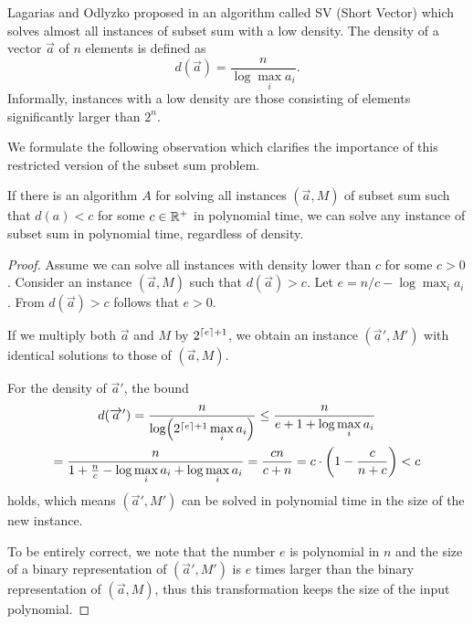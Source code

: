 Lagarias and Odlyzko proposed in \cite{lagarias-odlyzko} an algorithm
called SV (Short Vector) which solves almost all instances of subset sum
with a low density. The density of a vector $\vec{a}$ of $n$ elements is
defined as
$$
    d(\vec{a}) = \frac{n}{\log\max\limits_ia_i}.
$$
Informally, instances with a low density are those consisting of elements
significantly larger than $2^n$.

We formulate the following observation which clarifies the importance of
this restricted version of the subset sum problem.

\begin{observation}\label{observation:subset-sum-low-density-reduction}
    If there is an algorithm $A$ for solving all instances $(\vec{a}, M)$
    of subset sum such that $d(a) < c$ for some $c \in \mathbb{R}^+$ in polynomial
    time, we can solve any instance of subset sum in polynomial time,
    regardless of density.
\end{observation}

\begin{proof}
    Assume we can solve all instances with density lower than $c$ for some
    $c > 0$. Consider an instance $(\vec{a}, M)$ such that $d(\vec{a}) >
    c$. Let $e = n/c - \log\max_ia_i$. From $d(\vec{a}) > c$ follows that
    $e > 0$.
    
    If we multiply both $\vec{a}$ and $M$ by $2^{\lceil e\rceil+1}$, we obtain
    an instance $(\vec{a}', M')$ with identical solutions to those of
    $(\vec{a}, M)$.

    For the density of $\vec{a}'$, the bound
    \begin{multline*}
        d(\vec{a}')
        = \frac{n}{\log\paren*{2^{\ceil{e}+1} \max\limits_ia_i}}
        \leq \frac{n}{e + 1 + \log\max\limits_ia_i}
        \\
        = \frac{n}{1 + \frac{n}{c} - \log\max\limits_ia_i + \log\max\limits_ia_i}
        = \frac{cn}{c + n}
        = c \cdot \paren*{1 - \frac{c}{n+c}} < c
    \end{multline*}
    holds, which means $(\vec{a}', M')$ can be solved in polynomial time
    in the size of the new instance.

    To be entirely correct, we note that the number $e$ is polynomial in
    $n$ and the size of a binary representation of $(\vec{a}', M')$ is $e$
    times larger than the binary representation of $(\vec{a}, M)$,
    thus this transformation keeps the size of the input polynomial.
\end{proof}

